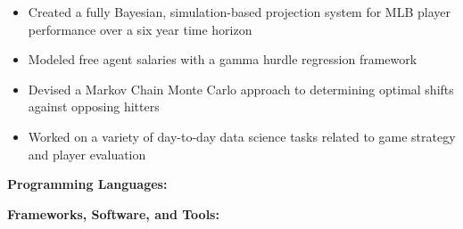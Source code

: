 \documentclass[10pt,a4paper,ragged2e,withhyper]{altacv}
\begin{document}
		\divider

		\begin{itemize}
		\item Created a fully Bayesian, simulation-based projection system for MLB player performance over a six year time horizon
		\item Modeled free agent salaries with a gamma hurdle regression framework
		\item Devised a Markov Chain Monte Carlo approach to determining optimal shifts against opposing hitters
		\item Worked on a variety of day-to-day data science tasks related to game strategy and player evaluation
		\end{itemize}

		\setcolumnwidth{4cm, 5cm,5cm} 
		\begin{paracol}{3}

		
		
		\divider


		\switchcolumn
		
		\textbf{Programming Languages:}\\
		\medskip

		\smallskip
		\textbf{Frameworks, Software, and Tools:}\\
		\medskip

		 \\
		 \\

		\switchcolumn
		
		
		\\
		\\
		\\
		\\
		\\
		\\
		
		\end{paracol}
\end{document}
